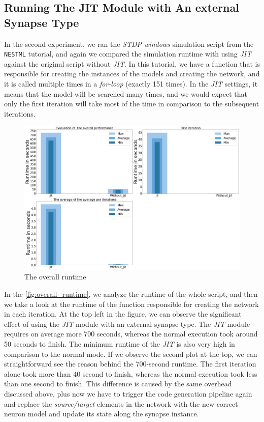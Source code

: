 \subsection*{Running The JIT Module with An external Synapse Type}

In the second experiment, we ran the \emph{STDP windows} simulation script from the \texttt{NESTML} tutorial, and again we compared the simulation runtime with using \emph{JIT} against the original script without \emph{JIT}. In this tutorial, we have a function that is responsible for creating the instances of the models and creating the network, and it is called multiple times in a \emph{for-loop} (exactly 151 times). In the \emph{JIT} settings, it means that the model will be searched many times, and we would expect that only the first iteration will take most of the time in comparison to the subsequent iterations. 

\begin{figure}[ht!]
    \centering
    \includegraphics[width=\textwidth]{src/pic/synapse_neuron_eval.png}
    \caption{The overall runtime}
    \label{fig:overall_runtime}
\end{figure}

In the \autoref{fig:overall_runtime}, we analyze the runtime of the whole script, and then we take a look at the runtime of the function responsible for creating the network in each iteration. At the top left in the figure, we can observe the significant effect of using the \emph{JIT} module with an external synapse type.  The \emph{JIT} module requires on average more 700 seconds, whereas the normal execution took around 50 seconds to finish. The minimum runtime of the \emph{JIT} is also very high in comparison to the normal mode. If we observe the second plot at the top, we can straightforward see the reason behind the 700-second runtime. The first iteration alone took more than 40 second to finish, whereas the normal execution took less than one second to finish. This difference is caused by the same overhead discussed above, plus now we have to  trigger the code generation pipeline again and replace the \emph{source/target} elements in the network with the new correct neuron model and update its state along the synapse instance. 

